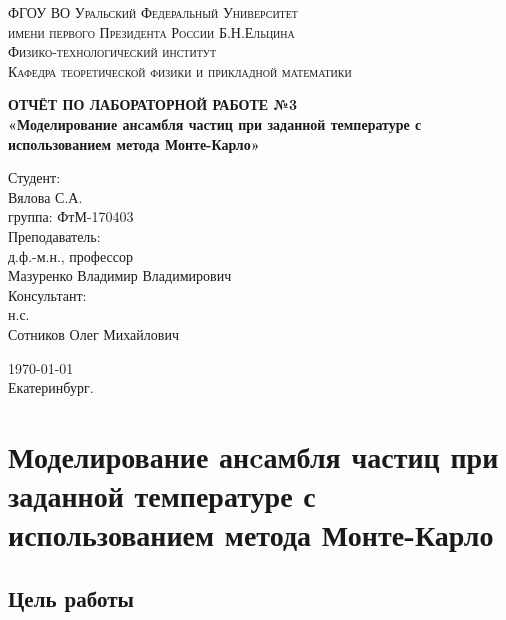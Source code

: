 \documentclass[14pt,a4paper,report]{ncc}
\begin{document}
\def\contentsname{Содержание}

\begin{titlepage}
\begin{center}
\textsc{ФГОУ ВО Уральский Федеральный Университет \\ имени первого Президента России Б.Н.Ельцина\\[5mm]
Физико-технологический институт\\[2mm]
Кафедра теоретической физики и прикладной математики}

\vfill

\textbf{ОТЧЁТ ПО ЛАБОРАТОРНОЙ РАБОТЕ №3\\[3mm]
«Моделирование анcамбля частиц при заданной температуре с использованием метода Монте-Карло»\\[6mm]
}
\end{center}

\hfill
\begin{minipage}{.5\textwidth}
Студент:\\[2mm] 
Вялова С.А.\\
группа: ФтМ-170403 \\[5mm]

Преподаватель:\\[2mm] 
д.ф.-м.н., профессор\\
Мазуренко Владимир Владимирович\\[5mm]

Консультант:\\[2mm] 
н.с.\\
Сотников Олег Михайлович\\

\end{minipage}%
\vfill
\begin{center}
\today  \\
 Екатеринбург.
\end{center}
\end{titlepage}

\tableofcontents
\newpage
\chapter{Моделирование анcамбля частиц при заданной температуре с использованием метода Монте-Карло}
\section{Цель работы}
\end{document}
